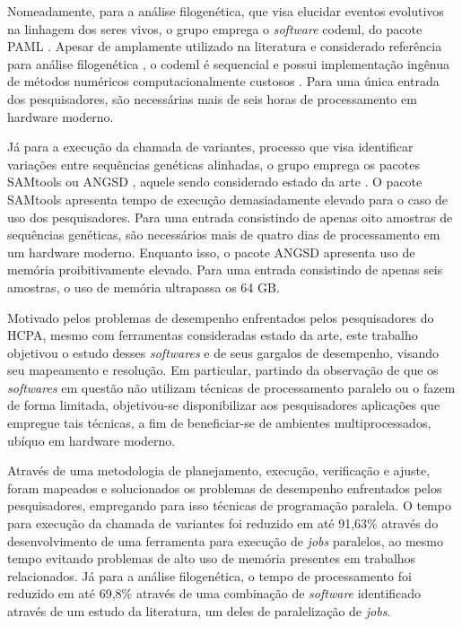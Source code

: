 \documentclass[cic,tc]{iiufrgs}
\begin{document}
Nomeadamente, para a análise filogenética, que visa elucidar eventos evolutivos
na linhagem dos seres vivos, o grupo emprega o \textit{software} codeml, do pacote
PAML \cite{yang2007paml}. Apesar de amplamente utilizado na literatura e
considerado referência para análise filogenética \cite{maldonado2016lmap}, o
codeml é sequencial e possui implementação ingênua de métodos numéricos
computacionalmente custosos \cite{yang2020paml}. Para uma única entrada dos
pesquisadores, são necessárias mais de seis horas de processamento em hardware
moderno.

Já para a execução da chamada de variantes, processo que visa identificar
variações entre sequências genéticas alinhadas, o grupo emprega os pacotes
SAMtools \cite{li2009sequence} ou ANGSD \cite{korneliussen2014angsd}, aquele
sendo considerado estado da
arte \cite{poplin2018universal} \cite{yao2020evaluation}. O pacote SAMtools
apresenta tempo de execução demasiadamente elevado para o caso de uso dos
pesquisadores. Para uma entrada consistindo de apenas oito amostras de
sequências genéticas, são necessários mais de quatro dias de processamento em
um hardware moderno. Enquanto isso, o pacote ANGSD apresenta uso de memória
proibitivamente elevado. Para uma entrada consistindo de apenas seis amostras,
o uso de memória ultrapassa os 64 GB.

%
%
Motivado pelos problemas de desempenho enfrentados pelos pesquisadores do HCPA,
mesmo com ferramentas consideradas estado da arte, este trabalho objetivou o
estudo desses \textit{softwares} e de seus gargalos de desempenho, visando seu
mapeamento e resolução. Em particular, partindo da observação de que os
\textit{softwares} em questão não utilizam técnicas de processamento paralelo ou o fazem
de forma limitada, objetivou-se disponibilizar aos pesquisadores aplicações que
empregue tais técnicas, a fim de beneficiar-se de ambientes multiprocessados,
ubíquo em hardware moderno.

%
%
Através de uma metodologia de planejamento, execução, verificação e ajuste,
foram mapeados e solucionados os problemas de desempenho enfrentados pelos
pesquisadores, empregando para isso técnicas de programação paralela. O tempo
para execução da chamada de variantes foi reduzido em até 91,63\% através do
desenvolvimento de uma ferramenta para execução de \textit{jobs} paralelos, ao
mesmo tempo evitando problemas de alto uso de memória presentes em trabalhos
relacionados. Já para a análise filogenética, o tempo de processamento foi
reduzido em até 69,8\% através de uma combinação de \textit{software} identificado
através de um estudo da literatura, um deles de paralelização de \textit{jobs}.
\end{document}
